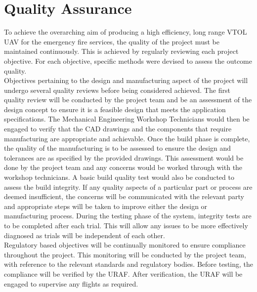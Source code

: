 \begin{appendices}
\begin{landscape}
\end{landscape}
\restoregeometry

\section{Quality Assurance}
\label{app_quality}
To achieve the overarching aim of producing a high efficiency, long range VTOL UAV for the emergency fire services, the quality of the project must be maintained continuously. This is achieved by regularly reviewing each project objective. For each objective, specific methods were devised to assess the outcome quality.\\

Objectives pertaining to the design and manufacturing aspect of the project will undergo several quality reviews before being considered achieved. The first quality review will be conducted by the project team and be an assessment of the design concept to ensure it is a feasible design that meets the application specifications. The Mechanical Engineering Workshop Technicians would then be engaged to verify that the CAD drawings and the components that require manufacturing are appropriate and achievable. Once the build phase is complete, the quality of the manufacturing is to be assessed to ensure the design and tolerances are as specified by the provided drawings. This assessment would be done by the project team and any concerns would be worked through with the workshop technicians. A basic build quality test would also be conducted to assess the build integrity. If any quality aspects of a particular part or process are deemed insufficient, the concerns will be communicated with the relevant party and appropriate steps will be taken to improve either the design or manufacturing process. During the testing phase of the system, integrity tests are to be completed after each trial. This will allow any issues to be more effectively diagnosed as trials will be independent of each other.\\

Regulatory based objectives will be continually monitored to ensure compliance throughout the project. This monitoring will be conducted by the project team, with reference to the relevant standards and regulatory bodies. Before testing, the compliance will be verified by the URAF. After verification, the URAF will be engaged to supervise any flights as required.\\


\end{appendices}
